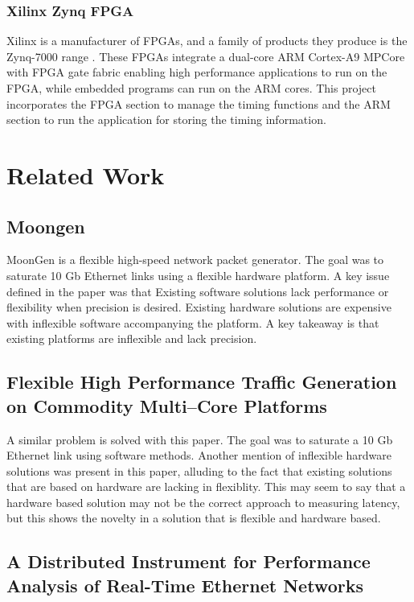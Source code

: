 \subsubsection{Xilinx Zynq FPGA}

\par Xilinx is a manufacturer of FPGAs, and a family of products they produce is the Zynq-7000 range \cite{fpga}.
These FPGAs integrate a dual-core ARM Cortex-A9 MPCore with FPGA gate fabric enabling high performance 
applications to run on the FPGA, while embedded programs can run on the ARM cores.
This project incorporates the FPGA section to manage the timing functions and the ARM section to run the 
application for storing the timing information.

\section{Related Work}

\subsection{Moongen}

\par MoonGen is a flexible high-speed network packet generator. The goal was to saturate 10 Gb Ethernet links using 
a flexible hardware platform. A key issue defined in the paper was that Existing software solutions lack performance
or flexibility when precision is desired. Existing hardware solutions are expensive with inflexible software accompanying
the platform. A key takeaway is that existing platforms are inflexible and lack precision.

\subsection{Flexible High Performance Traffic Generation on Commodity Multi–Core Platforms}

\par A similar problem is solved with this paper. The goal was to saturate a 10 Gb Ethernet link using software methods.
Another mention of inflexible hardware solutions was present in this paper, alluding to the fact that existing
solutions that are based on hardware are lacking in flexiblity. This may seem to say that a hardware based solution may
not be the correct approach to measuring latency, but this shows the novelty in a solution that is flexible
and hardware based.

\subsection{A Distributed Instrument for Performance Analysis of Real-Time Ethernet Networks}


